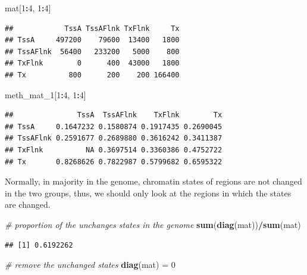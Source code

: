 \documentclass[]{book}
\newenvironment{Shaded}{\begin{snugshade}}{\end{snugshade}}
\newcommand{\KeywordTok}[1]{\textcolor[rgb]{0.13,0.29,0.53}{\textbf{#1}}}
\newcommand{\DecValTok}[1]{\textcolor[rgb]{0.00,0.00,0.81}{#1}}
\newcommand{\StringTok}[1]{\textcolor[rgb]{0.31,0.60,0.02}{#1}}
\newcommand{\CommentTok}[1]{\textcolor[rgb]{0.56,0.35,0.01}{\textit{#1}}}
\newcommand{\OperatorTok}[1]{\textcolor[rgb]{0.81,0.36,0.00}{\textbf{#1}}}
\newcommand{\NormalTok}[1]{#1}
\begin{document}
\begin{Shaded}
\begin{Highlighting}[]
\NormalTok{mat[}\DecValTok{1}\OperatorTok{:}\DecValTok{4}\NormalTok{, }\DecValTok{1}\OperatorTok{:}\DecValTok{4}\NormalTok{]}
\end{Highlighting}
\end{Shaded}

\begin{verbatim}
##            TssA TssAFlnk TxFlnk     Tx
## TssA     497200    79600  13400   1800
## TssAFlnk  56400   233200   5000    800
## TxFlnk        0      400  43000   1800
## Tx          800      200    200 166400
\end{verbatim}

\begin{Shaded}
\begin{Highlighting}[]
\NormalTok{meth_mat_}\DecValTok{1}\NormalTok{[}\DecValTok{1}\OperatorTok{:}\DecValTok{4}\NormalTok{, }\DecValTok{1}\OperatorTok{:}\DecValTok{4}\NormalTok{]}
\end{Highlighting}
\end{Shaded}

\begin{verbatim}
##               TssA  TssAFlnk    TxFlnk        Tx
## TssA     0.1647232 0.1580874 0.1917435 0.2690045
## TssAFlnk 0.2591677 0.2689880 0.3616242 0.3411387
## TxFlnk          NA 0.3697514 0.3360386 0.4752722
## Tx       0.8268626 0.7822987 0.5799682 0.6595322
\end{verbatim}

Normally, in majority in the genome, chromatin states of regions are not
changed in the two groups, thus, we should only look at the regions in
which the states are changed.

\begin{Shaded}
\begin{Highlighting}[]
\CommentTok{# proportion of the unchanges states in the genome}
\KeywordTok{sum}\NormalTok{(}\KeywordTok{diag}\NormalTok{(mat))}\OperatorTok{/}\KeywordTok{sum}\NormalTok{(mat)}
\end{Highlighting}
\end{Shaded}

\begin{verbatim}
## [1] 0.6192262
\end{verbatim}

\begin{Shaded}
\begin{Highlighting}[]
\CommentTok{# remove the unchanged states}
\KeywordTok{diag}\NormalTok{(mat) =}\StringTok{ }\DecValTok{0}
\end{Highlighting}
\end{Shaded}
\end{document}
